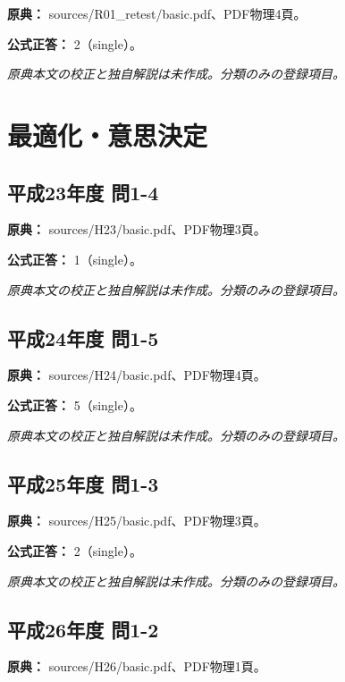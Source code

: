\noindent\textbf{原典：} sources/R01\_retest/basic.pdf、PDF物理4頁。

\textbf{公式正答：} 2（single）。

\par\textit{原典本文の校正と独自解説は未作成。分類のみの登録項目。}

\section{最適化・意思決定}

\subsection{平成23年度 問1-4}
\label{q:h23-reg-basic-1-4}

\noindent\textbf{原典：} sources/H23/basic.pdf、PDF物理3頁。

\textbf{公式正答：} 1（single）。

\par\textit{原典本文の校正と独自解説は未作成。分類のみの登録項目。}

\subsection{平成24年度 問1-5}
\label{q:h24-reg-basic-1-5}

\noindent\textbf{原典：} sources/H24/basic.pdf、PDF物理4頁。

\textbf{公式正答：} 5（single）。

\par\textit{原典本文の校正と独自解説は未作成。分類のみの登録項目。}

\subsection{平成25年度 問1-3}
\label{q:h25-reg-basic-1-3}

\noindent\textbf{原典：} sources/H25/basic.pdf、PDF物理3頁。

\textbf{公式正答：} 2（single）。

\par\textit{原典本文の校正と独自解説は未作成。分類のみの登録項目。}

\subsection{平成26年度 問1-2}
\label{q:h26-reg-basic-1-2}

\noindent\textbf{原典：} sources/H26/basic.pdf、PDF物理1頁。

